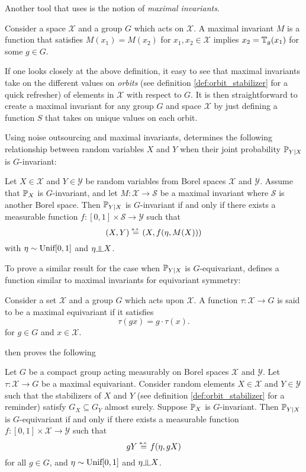 Another tool that \cite{bloemreddy2019probabilistic} uses is the notion of \textit{maximal invariants}.
\begin{definition} \label{def:maximal_invariants}
	Consider a space $\mathcal{X}$ and a group $G$ which acts on $\mathcal{X}$.
	A maximal invariant $M$ is a function that satisfies
	$M(x_1) = M(x_2)$ for $x_1, x_2 \in \mathcal{X}$ implies $x_2 = \mathbb{T}_g(x_1)$ for some $g \in G$.
\end{definition}
If one looks closely at the above definition, it easy to see that maximal invariants take on the different values on \textit{orbits} (see definition \ref{def:orbit_stabilizer} for a quick refresher) of elements in $\mathcal{X}$ with respect to $G$.
It is then straightforward to create a maximal invariant for any group $G$ and space $\mathcal{X}$ by just defining a function $S$ that takes on unique values on each orbit.

Using noise outsourcing and maximal invariants, \cite{bloemreddy2019probabilistic} determines the following relationship between random variables $X$ and $Y$ when their joint probability $\mathbb{P}_{Y|X}$ is $G$-invariant:

\begin{theorem} \label{thm:invariance}
Let $X \in \mathcal{X}$ and $Y \in \mathcal{Y}$ be random variables from Borel spaces $\mathcal{X}$ and $\mathcal{Y}$.
Assume that $\mathbb{P}_{X}$ is $G$-invariant, and let $M : \mathcal{X} \to \mathcal{S}$ be a maximal invariant where $\mathcal{S}$ is another Borel space.
Then $\mathbb{P}_{Y|X}$ is $G$-invariant if and only if there exists a measurable function $f: [0,1] \times \mathcal{S} \to \mathcal{Y}$ such that
$$
	(X,Y) \stackrel{\text{\rm\tiny a.s.}}{=} (X, f(\eta,M(X)))
$$
with $\eta \sim \text{\rm Unif}[0,1]$ and $\eta \indep X$.
\end{theorem} 
To prove a similar result for the case when $\mathbb{P}_{Y|X}$ is $G$-equivariant, \cite{bloemreddy2019probabilistic} defines a function similar to maximal invariants for equivariant symmetry:
\begin{definition} \label{def:maximal_equivariant}
Consider a set $\mathcal{X}$ and a group $G$ which acts upon $\mathcal{X}$.
A function $\tau : \mathcal{X} \to G$ is said to be a maximal equivariant if it satisfies
$$
	\tau(g x) = g \cdot \tau(x).
$$
for $g \in G$ and $x \in \mathcal{X}$.
\end{definition}

\noindent
\cite{bloemreddy2019probabilistic} then proves the following
\begin{theorem} \label{thm:equivariance}
Let $G$ be a compact group acting measurably on Borel spaces $\mathcal{X}$ and $\mathcal{Y}$.
Let $\tau: \mathcal{X} \to G$ be a maximal equivariant.
Consider random elements $X \in \mathcal{X}$ and $Y \in \mathcal{Y}$ such that the stabilizers of $X$ and $Y$ (see definition \ref{def:orbit_stabilizer} for a reminder) satisfy $G_X \subseteq G_Y$ almost surely.
Suppose $\mathbb{P}_X$ is $G$-invariant.
Then $\mathbb{P}_{Y|X}$ is $G$-equivariant if and only if there exists a measurable function $f:[0,1] \times \mathcal{X} \to \mathcal{Y}$ such that
$$
	g Y \stackrel{\text{\rm\tiny a.s.}}{=} f(\eta, g X)
$$
for all $g \in G$, and $\eta \sim \text{\rm Unif}[0,1]$ and $\eta \indep X$.
\end{theorem}

